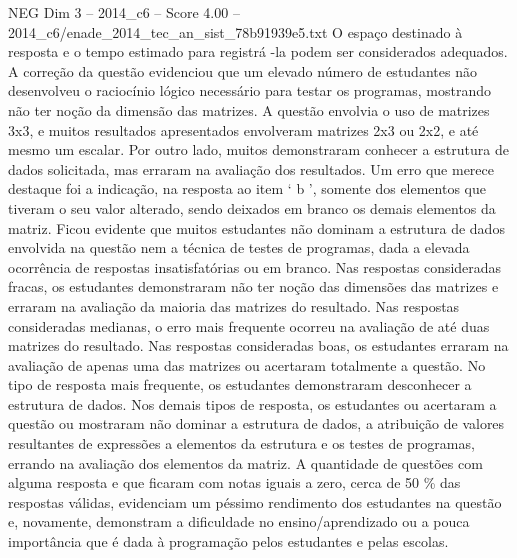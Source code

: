 \begin{textsample}{NEG Dim 3 – 2014\_c6 – Score 4.00 – 2014\_c6/enade\_2014\_tec\_an\_sist\_78b91939e5.txt}
O espaço destinado à resposta e o tempo estimado para registrá -la podem ser considerados adequados.
A correção da questão evidenciou que um elevado número de estudantes não desenvolveu o raciocínio lógico necessário para testar os programas, mostrando não ter noção da dimensão das matrizes.
A questão envolvia o uso de matrizes 3x3, e muitos resultados apresentados envolveram matrizes 2x3 ou 2x2, e até mesmo um escalar.
Por outro lado, muitos demonstraram conhecer a estrutura de dados solicitada, mas erraram na avaliação dos resultados.
Um erro que merece destaque foi a indicação, na resposta ao item ‘ b ’, somente dos elementos que tiveram o seu valor alterado, sendo deixados em branco os demais elementos da matriz.
Ficou evidente que muitos estudantes não dominam a estrutura de dados envolvida na questão nem a técnica de testes de programas, dada a elevada ocorrência de respostas insatisfatórias ou em branco.
Nas respostas consideradas fracas, os estudantes demonstraram não ter noção das dimensões das matrizes e erraram na avaliação da maioria das matrizes do resultado.
Nas respostas consideradas medianas, o erro mais frequente ocorreu na avaliação de até duas matrizes do resultado.
Nas respostas consideradas boas, os estudantes erraram na avaliação de apenas uma das matrizes ou acertaram totalmente a questão.
No tipo de resposta mais frequente, os estudantes demonstraram desconhecer a estrutura de dados.
Nos demais tipos de resposta, os estudantes ou acertaram a questão ou mostraram não dominar a estrutura de dados, a atribuição de valores resultantes de expressões a elementos da estrutura e os testes de programas, errando na avaliação dos elementos da matriz.
A quantidade de questões com alguma resposta e que ficaram com notas iguais a zero, cerca de 50 \% das respostas válidas, evidenciam um péssimo rendimento dos estudantes na questão e, novamente, demonstram a dificuldade no ensino/aprendizado ou a pouca importância que é dada à programação pelos estudantes e pelas escolas.

\end{textsample}
